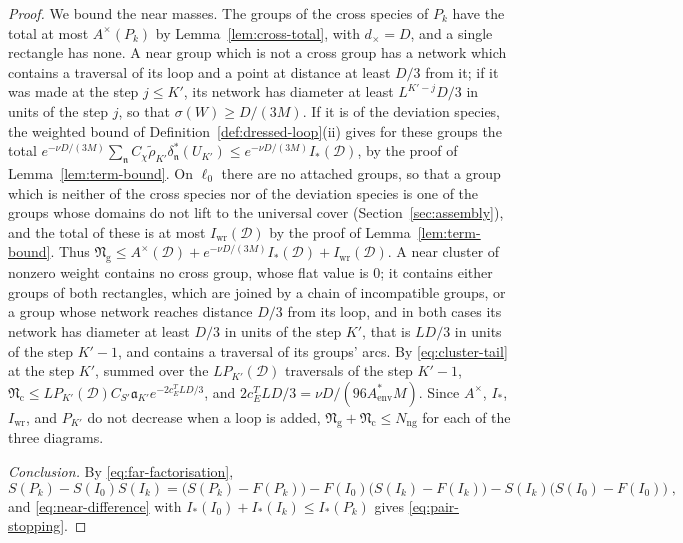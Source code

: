 \documentclass[11pt]{preprint}
\numberwithin{equation}{section}
\theoremstyle{definition}
\theoremstyle{remark}
\theoremstyle{plain}
\begin{document}
\begin{proof}
We bound the near masses. The groups of the cross species of $P_k$ have the total at most $A^\times(P_k)$ by Lemma~\ref{lem:cross-total}, with $d_\times = D$, and a single rectangle has none. A near group which is not a cross group has a network which contains a traversal of its loop and a point at distance at least $D/3$ from it; if it was made at the step $j \leq K'$, its network has diameter at least $L^{K'-j}D/3$ in units of the step $j$, so that $\sigma(W) \geq D/(3M)$. If it is of the deviation species, the weighted bound of Definition~\ref{def:dressed-loop}(ii) gives for these groups the total $e^{-\nu D/(3M)}\sum_{\mathfrak n}C_\chi\tilde\rho_{K'}\delta^*_{\mathfrak n}(U_{K'}) \leq e^{-\nu D/(3M)}I_*(\mathcal D)$, by the proof of Lemma~\ref{lem:term-bound}. On $\ell_0$ there are no attached groups, so that a group which is neither of the cross species nor of the deviation species is one of the groups whose domains do not lift to the universal cover (Section~\ref{sec:assembly}), and the total of these is at most $I_{\mathrm{wr}}(\mathcal D)$ by the proof of Lemma~\ref{lem:term-bound}. Thus $\mathfrak N_{\mathrm g} \leq A^\times(\mathcal D) + e^{-\nu D/(3M)}I_*(\mathcal D) + I_{\mathrm{wr}}(\mathcal D)$. A near cluster of nonzero weight contains no cross group, whose flat value is $0$; it contains either groups of both rectangles, which are joined by a chain of incompatible groups, or a group whose network reaches distance $D/3$ from its loop, and in both cases its network has diameter at least $D/3$ in units of the step $K'$, that is $LD/3$ in units of the step $K' - 1$, and contains a traversal of its groups' arcs. By \eqref{eq:cluster-tail} at the step $K'$, summed over the $LP_{K'}(\mathcal D)$ traversals of the step $K' - 1$, $\mathfrak N_{\mathrm c} \leq LP_{K'}(\mathcal D)C_{S'}\mathfrak a_{K'}e^{-2c^T_ELD/3}$, and $2c^T_ELD/3 = \nu D/(96A^*_{\mathrm{env}}M)$. Since $A^\times$, $I_*$, $I_{\mathrm{wr}}$, and $P_{K'}$ do not decrease when a loop is added, $\mathfrak N_{\mathrm g} + \mathfrak N_{\mathrm c} \leq N_{\mathrm{ng}}$ for each of the three diagrams.

\emph{Conclusion.} By \eqref{eq:far-factorisation},
\begin{equation}\label{eq:pair-telescope}
    S(P_k) - S(I_0)S(I_k) = \bigl(S(P_k) - F(P_k)\bigr) - F(I_0)\bigl(S(I_k) - F(I_k)\bigr) - S(I_k)\bigl(S(I_0) - F(I_0)\bigr)\;,
\end{equation}
and \eqref{eq:near-difference} with $I_*(I_0) + I_*(I_k) \leq I_*(P_k)$ gives \eqref{eq:pair-stopping}.
\end{proof}
\end{document}
